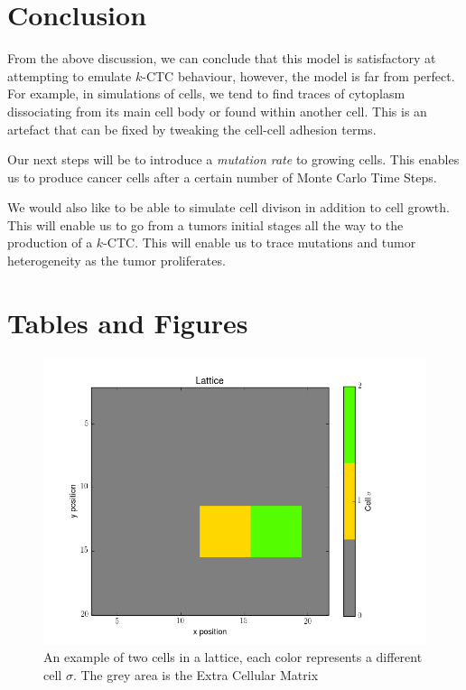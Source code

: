 \documentclass[12pt]{article}
\begin{document}
\section{Conclusion}

From the above discussion, we can conclude that this model is satisfactory at attempting to emulate $k$-CTC behaviour, however, the model is far from perfect. For example, in simulations of cells, we tend to find traces of cytoplasm dissociating from its main cell body or found within another cell. This is an artefact that can be fixed by tweaking the cell-cell adhesion terms. 

Our next steps will be to introduce a \emph{mutation rate} to growing cells. This enables us to produce cancer cells after a certain number of Monte Carlo Time Steps.

We would also like to be able to simulate cell divison in addition to cell growth. This will enable us to go from a tumors initial stages all the way to the production of a $k$-CTC. This will enable us to trace mutations and tumor heterogeneity as the tumor proliferates.



\pagebreak
\section{Tables and Figures}

\begin{figure}[H]
	\centering
	\includegraphics[scale=0.5]{img/basic}
	\caption{An example of two cells in a lattice, each color represents a different cell $\sigma$. The grey area is the Extra Cellular Matrix}
	\label{basic}
\end{figure}
\end{document}
